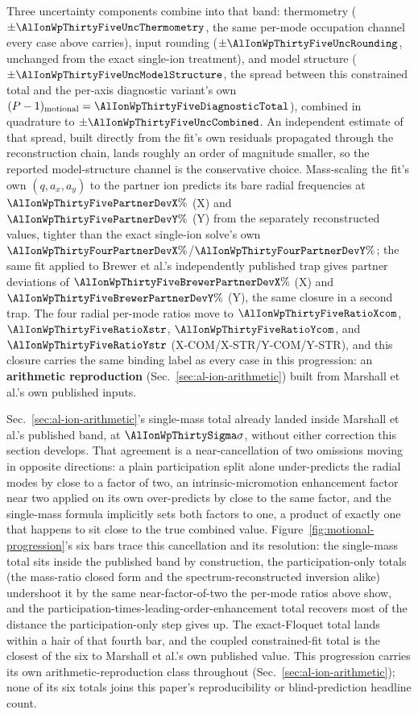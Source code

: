 \documentclass[aps,pra,superscriptaddress,groupedaddress,nofootinbib]{revtex4-2}
\begin{document}
Three uncertainty components combine into that band: thermometry
($\pm\AlIonWpThirtyFiveUncThermometry$, the same per-mode occupation
channel every case above carries), input rounding
($\pm\AlIonWpThirtyFiveUncRounding$, unchanged from the exact single-ion
treatment), and model structure ($\pm\AlIonWpThirtyFiveUncModelStructure$,
the spread between this constrained total and the per-axis diagnostic
variant's own $(P-1)_{\rm motional}=\AlIonWpThirtyFiveDiagnosticTotal$),
combined in quadrature to $\pm\AlIonWpThirtyFiveUncCombined$. An
independent estimate of that spread, built directly from the fit's own
residuals propagated through the reconstruction chain, lands roughly an
order of magnitude smaller, so the reported model-structure channel is the
conservative choice. Mass-scaling the fit's own $(q,a_x,a_y)$ to the
partner ion predicts its bare radial frequencies at
$\AlIonWpThirtyFivePartnerDevX\%$ (X) and $\AlIonWpThirtyFivePartnerDevY\%$
(Y) from the separately reconstructed values, tighter than the exact
single-ion solve's own $\AlIonWpThirtyFourPartnerDevX\%$/$\AlIonWpThirtyFourPartnerDevY\%$;
the same fit applied to Brewer et al.'s independently published trap gives
partner deviations of $\AlIonWpThirtyFiveBrewerPartnerDevX\%$ (X) and
$\AlIonWpThirtyFiveBrewerPartnerDevY\%$ (Y), the same closure in a second
trap. The four radial per-mode ratios move to $\AlIonWpThirtyFiveRatioXcom$,
$\AlIonWpThirtyFiveRatioXstr$, $\AlIonWpThirtyFiveRatioYcom$, and
$\AlIonWpThirtyFiveRatioYstr$ (X-COM/X-STR/Y-COM/Y-STR), and this closure
carries the same binding label as every case in this progression: an
\textbf{arithmetic reproduction} (Sec.~\ref{sec:al-ion-arithmetic}) built
from Marshall et al.'s own published inputs.

Sec.~\ref{sec:al-ion-arithmetic}'s single-mass total already landed inside
Marshall et al.'s published band, at $\AlIonWpThirtySigma\sigma$, without
either correction this section develops. That agreement is a
near-cancellation of two omissions moving in opposite directions: a plain
participation split alone under-predicts the radial modes by close to a
factor of two, an intrinsic-micromotion enhancement factor near two applied
on its own over-predicts by close to the same factor, and the single-mass
formula implicitly sets both factors to one, a product of exactly one that
happens to sit close to the true combined value.
Figure~\ref{fig:motional-progression}'s six bars trace this cancellation
and its resolution: the single-mass total sits
inside the published band by construction, the participation-only totals
(the mass-ratio closed form and the spectrum-reconstructed inversion alike)
undershoot it by the same near-factor-of-two the per-mode ratios above
show, and the participation-times-leading-order-enhancement total recovers
most of the distance the participation-only step gives up. The exact-Floquet
total lands within a hair of that fourth bar, and the coupled constrained-fit
total is the closest of the six to Marshall et al.'s own published value.
This progression carries its own arithmetic-reproduction class throughout
(Sec.~\ref{sec:al-ion-arithmetic}); none of its six totals joins this
paper's reproducibility or blind-prediction headline count.
\end{document}
